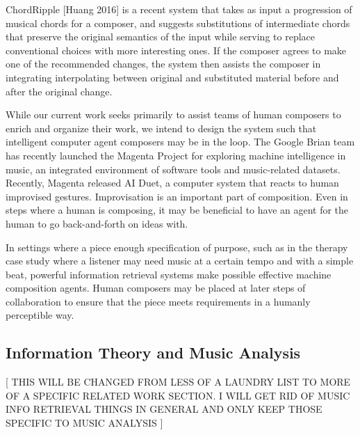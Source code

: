 \documentclass[final,authoryear,11pt,times]{elsarticle}
\begin{document}
ChordRipple [Huang 2016] is a recent system that takes as input a progression of musical chords for a composer, and suggests substitutions of intermediate chords that preserve the original semantics of the input while serving to replace conventional choices with more interesting ones. If the composer agrees to make one of the recommended changes, the system then assists the composer in integrating interpolating between original and substituted material before and after the original change.

While our current work seeks primarily to assist teams of human composers to enrich and organize their work, we intend to design the system such that intelligent computer agent composers may be in the loop. The Google Brian team has recently launched the Magenta Project for exploring machine intelligence in music, an integrated environment of software tools and music-related datasets. Recently, Magenta released AI Duet, a computer system that reacts to human improvised gestures. Improvisation is an important part of composition. Even in steps where a human is composing, it may be beneficial to have an agent for the human to go back-and-forth on ideas with. 

In settings where a piece enough specification of purpose, such as in the therapy case study where a listener may need music at a certain tempo and with a simple beat, powerful information retrieval systems make possible effective machine composition agents. Human composers may be placed at later steps of collaboration to ensure that the piece meets requirements in a humanly perceptible way.

\subsection{Information Theory and Music Analysis}

[ THIS WILL BE CHANGED FROM LESS OF A LAUNDRY LIST TO MORE OF A SPECIFIC RELATED WORK SECTION. I WILL GET RID OF MUSIC INFO RETRIEVAL THINGS IN GENERAL AND ONLY KEEP THOSE SPECIFIC TO MUSIC ANALYSIS ]
\end{document}
